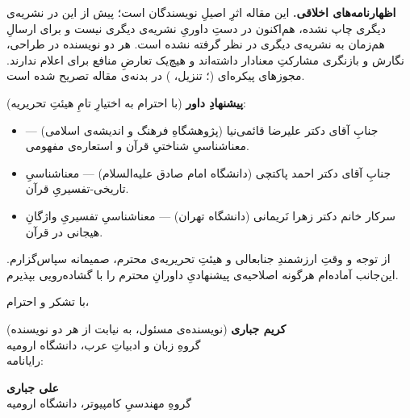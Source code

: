 \documentclass[12pt,a4paper]{article}
\begin{document}
\textbf{اظهارنامه‌های اخلاقی.} این مقاله اثرِ اصیلِ نویسندگان است؛ پیش از این در نشریه‌ی دیگری چاپ نشده، هم‌اکنون در دستِ داوریِ نشریه‌ی دیگری نیست و برای ارسالِ هم‌زمان به نشریه‌ی دیگری در نظر گرفته نشده است. هر دو نویسنده در طراحی، نگارش و بازنگری مشارکتِ معنادار داشته‌اند و هیچ‌یک تعارضِ منافع برای اعلام ندارند. مجوزهای پیکره‌ای (؛ تنزیل، ) در بدنه‌ی مقاله تصریح شده است.

\textbf{پیشنهادِ داور} (با احترام به اختیارِ تامِ هیئتِ تحریریه):

\begin{itemize}\setlength{\itemsep}{0pt}
  \item جنابِ آقای دکتر علیرضا قائمی‌نیا (پژوهشگاهِ فرهنگ و اندیشه‌ی اسلامی) --- معناشناسیِ شناختیِ قرآن و استعاره‌ی مفهومی.
  \item جنابِ آقای دکتر احمد پاکتچی (دانشگاه امام صادق علیه‌السلام) --- معناشناسیِ تاریخی-تفسیریِ قرآن.
  \item سرکار خانم دکتر زهرا نَریمانی (دانشگاه تهران) --- معناشناسیِ تفسیریِ واژگانِ هیجانی در قرآن.
\end{itemize}

از توجه و وقتِ ارزشمندِ جنابعالی و هیئتِ تحریریه‌ی محترم، صمیمانه سپاس‌گزارم. این‌جانب آماده‌ام هرگونه اصلاحیه‌ی پیشنهادیِ داورانِ محترم را با گشاده‌رویی بپذیرم.

\vspace{0.6em}
\noindent با تشکر و احترام،

\vspace{0.8em}
\noindent\textbf{کریم جباری} (نویسنده‌ی مسئول، به نیابت از هر دو نویسنده)\\
گروهِ زبان و ادبیاتِ عرب، دانشگاه ارومیه\\
رایانامه: 

\vspace{0.4em}
\noindent\textbf{علی جباری}\\
گروهِ مهندسیِ کامپیوتر، دانشگاه ارومیه
\end{document}
